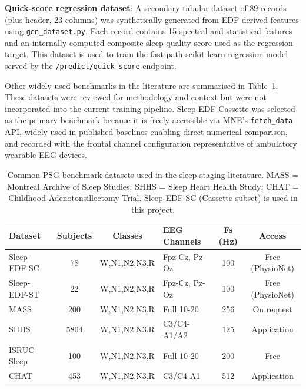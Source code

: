 \documentclass[10pt]{article}
\begin{document}
\textbf{Quick-score regression dataset}: A secondary tabular dataset of 89 records (plus header, 23 columns) was synthetically generated from EDF-derived features using \texttt{gen\_dataset.py}. Each record contains 15 spectral and statistical features and an internally computed composite sleep quality score used as the regression target. This dataset is used to train the fast-path scikit-learn regression model served by the \texttt{/predict/quick-score} endpoint.

Other widely used benchmarks in the literature are summarised in Table~\ref{tab:dataset-compare}. These datasets were reviewed for methodology and context but were not incorporated into the current training pipeline. Sleep-EDF Cassette was selected as the primary benchmark because it is freely accessible via MNE's \texttt{fetch\_data} API, widely used in published baselines enabling direct numerical comparison, and recorded with the frontal channel configuration representative of ambulatory wearable EEG devices.

\begin{table}[h]
\centering
\small
\renewcommand{\arraystretch}{1.2}
\begin{tabular}{|p{2.2cm}|c|c|p{1.8cm}|c|c|}
\hline
\textbf{Dataset} & \textbf{Subjects} & \textbf{Classes} & \textbf{EEG Channels} & \textbf{Fs (Hz)} & \textbf{Access} \\\hline
Sleep-EDF-SC~\cite{kemp2000analysis} & 78 & W,N1,N2,N3,R & Fpz-Cz, Pz-Oz & 100 & Free (PhysioNet) \\\hline
Sleep-EDF-ST & 22 & W,N1,N2,N3,R & Fpz-Cz, Pz-Oz & 100 & Free (PhysioNet) \\\hline
MASS & 200 & W,N1,N2,N3,R & Full 10-20 & 256 & On request \\\hline
SHHS & 5804 & W,N1,N2,N3,R & C3/C4-A1/A2 & 125 & Application \\\hline
ISRUC-Sleep & 100 & W,N1,N2,N3,R & Full 10-20 & 200 & Free \\\hline
CHAT & 453 & W,N1,N2,N3,R & C3/C4-A1 & 512 & Application \\\hline
\end{tabular}
\caption{Common PSG benchmark datasets used in the sleep staging literature. MASS = Montreal Archive of Sleep Studies; SHHS = Sleep Heart Health Study; CHAT = Childhood Adenotonsillectomy Trial. Sleep-EDF-SC (Cassette subset) is used in this project.}
\label{tab:dataset-compare}
\end{table}

\end{document}

